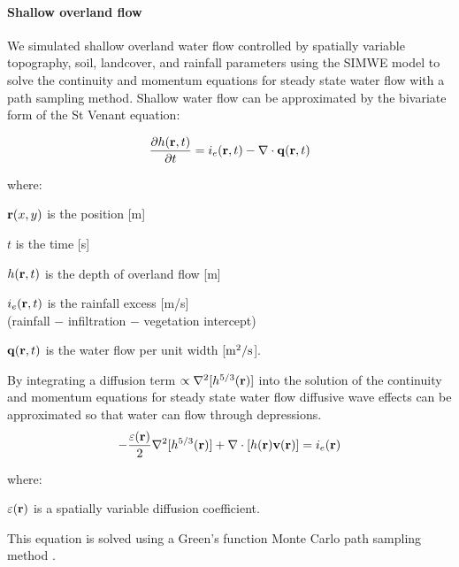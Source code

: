 \documentclass{isprs}
\begin{document}
\paragraph{Shallow overland flow}
We simulated shallow overland water flow controlled by spatially variable topography, soil, landcover, and rainfall parameters using the SIMWE model to solve the continuity and momentum equations for steady state water flow with a path sampling method. 
%
Shallow water flow can be approximated by
the bivariate form of the St Venant equation:

\begin{equation}
\label{eq:water}
{\partial h({\bf r},t) \over \partial t} =
 i_e({\bf r},t) - \nabla \cdot {\bf q}({\bf r},t)
\end{equation}

where:

\hspace*{1em} ${\bf r}(x,y)$ is the position [m]

\hspace*{1em} $t$ is the time [s]

\hspace*{1em} $h({\bf r},t)$ is the depth of overland flow [m]

\hspace*{1em} $i_e({\bf r},t)$ is the rainfall excess [m/s]\\
\hspace*{1em} (rainfall $-$ infiltration $-$ vegetation intercept) 

\hspace*{1em} ${\bf q}({\bf r},t)$ is the water flow per unit width [$\rm m^2/s$].

By integrating a diffusion term $ \propto \nabla^2 [h^{5/3}({\bf r})]$ 
into
the solution of the continuity and momentum equations for steady state water flow
diffusive wave effects can be approximated
so that water can flow through depressions. 
%
\begin{equation}
\label{eq:difwater}
-{\varepsilon({\bf r})\over 2 }\nabla^2 [h^{5/3}({\bf r})]
+\nabla \cdot [ h({\bf r}){\bf v}({\bf r})] = i_e({\bf r})
\end{equation}

 where:
 
 \hspace*{1em} $\varepsilon({\bf r})$ is a spatially variable diffusion coefficient.

This equation is solved using a Green's function Monte Carlo path sampling method \cite{Mitasova2004}.
\end{document}
